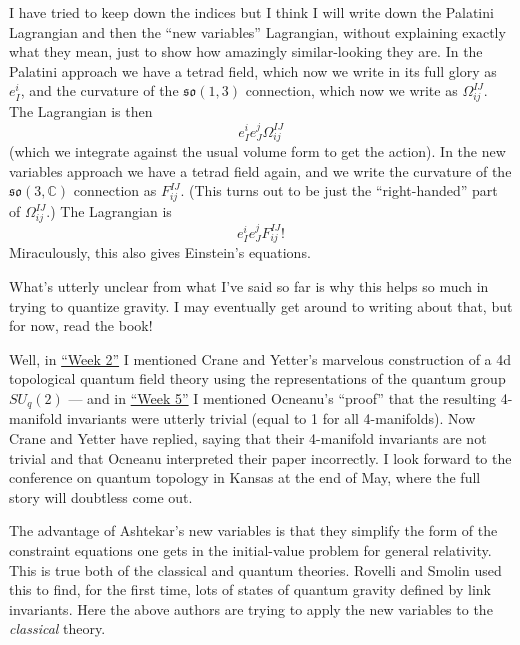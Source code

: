 \documentclass{article}
\def\tightlist{}
\renewcommand{\texttt}[1]{%
  \begingroup
  \ttfamily
  \begingroup\lccode`~=`/\lowercase{\endgroup\def~}{/\discretionary{}{}{}}%
  \begingroup\lccode`~=`[\lowercase{\endgroup\def~}{[\discretionary{}{}{}}%
  \begingroup\lccode`~=`.\lowercase{\endgroup\def~}{.\discretionary{}{}{}}%
  \catcode`/=\active\catcode`[=\active\catcode`.=\active
  \scantokens{#1\noexpand}%
  \endgroup
}
\begin{document}
I have tried to keep down the indices but I think I will write down the
Palatini Lagrangian and then the ``new variables'' Lagrangian, without
explaining exactly what they mean, just to show how amazingly
similar-looking they are. In the Palatini approach we have a tetrad
field, which now we write in its full glory as \(e_I^i\), and the
curvature of the \(\mathfrak{so}(1,3)\) connection, which now we write
as \(\Omega_{ij}^{IJ}\). The Lagrangian is then
\[e_I^i e_J^j \Omega_{ij}^{IJ}\] (which we integrate against the usual
volume form to get the action). In the new variables approach we have a
tetrad field again, and we write the curvature of the
\(\mathfrak{so}(3,\mathbb{C})\) connection as \(F_{ij}^{IJ}\). (This
turns out to be just the ``right-handed'' part of \(\Omega_{ij}^{IJ}\).)
The Lagrangian is \[e_I^i e_J^j F_{ij}^{IJ} !\] Miraculously, this also
gives Einstein's equations.

What's utterly unclear from what I've said so far is why this helps so
much in trying to quantize gravity. I may eventually get around to
writing about that, but for now, read the book!

\noindent
Well, in \protect\hyperlink{week2}{``Week 2''} I mentioned Crane and
Yetter's marvelous construction of a 4d topological quantum field theory
using the representations of the quantum group \(SU_q(2)\) --- and in
\protect\hyperlink{week5}{``Week 5''} I mentioned Ocneanu's ``proof''
that the resulting 4-manifold invariants were utterly trivial (equal to
1 for all 4-manifolds). Now Crane and Yetter have replied, saying that
their 4-manifold invariants are not trivial and that Ocneanu interpreted
their paper incorrectly. I look forward to the conference on quantum
topology in Kansas at the end of May, where the full story will
doubtless come out.

\noindent
The advantage of Ashtekar's new variables is that they simplify the form
of the constraint equations one gets in the initial-value problem for
general relativity. This is true both of the classical and quantum
theories. Rovelli and Smolin used this to find, for the first time, lots
of states of quantum gravity defined by link invariants. Here the above
authors are trying to apply the new variables to the \emph{classical}
theory.
\end{document}
